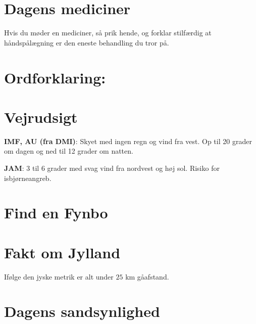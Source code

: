 

\begin{minipage}[b]{0.95\linewidth}
\begin{minipage}[t]{0.47\textwidth}
\vspace{3mm}
\section*{Dagens mediciner}
Hvis du møder en mediciner, så prik hende, og forklar stilfærdig at håndspålægning er den eneste behandling du tror på.

\section*{Ordforklaring: }

\end{minipage}%
\hfill\begin{minipage}[t]{0.47\textwidth}
\vspace{3mm}
\section*{Vejrudsigt}
\textbf{IMF, AU (fra DMI)}: Skyet med ingen regn og vind fra vest. Op til 20 grader om dagen og ned til 12 grader om natten.

\textbf{JAM}: 3 til 6 grader med svag vind fra nordvest og høj sol. Risiko for isbjørneangreb.

\section*{Find en Fynbo}


\section*{Fakt om Jylland}
Ifølge den jyske metrik er alt under $25$ km gåafstand.

\section*{Dagens sandsynlighed}


\end{minipage}
\end{minipage}

